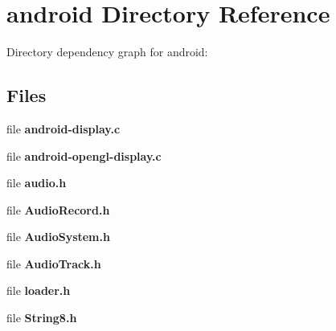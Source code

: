\section{android Directory Reference}
\label{dir_e6a0c564333ae2aa489c52fa70c1e9c9}
Directory dependency graph for android\-:
\subsection*{Files}
\begin{DoxyCompactItemize}
\item 
file {\bfseries android-\/display.\-c}
\item 
file {\bfseries android-\/opengl-\/display.\-c}
\item 
file {\bfseries audio.\-h}
\item 
file {\bfseries Audio\-Record.\-h}
\item 
file {\bfseries Audio\-System.\-h}
\item 
file {\bfseries Audio\-Track.\-h}
\item 
file {\bfseries loader.\-h}
\item 
file {\bfseries String8.\-h}
\end{DoxyCompactItemize}
